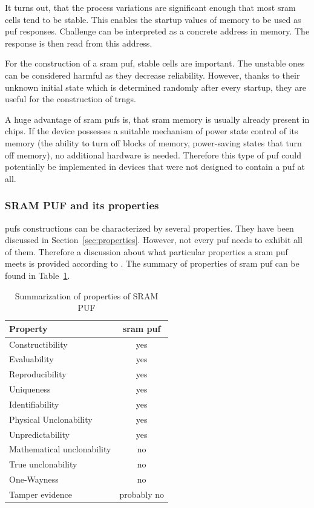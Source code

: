 It turns out, that the process variations are significant enough that most \gls{sram} cells tend to be stable. This enables the startup values of memory to be used as \gls{puf} responses. Challenge can be interpreted as a concrete address in memory. The response is then read from this address.\cite{Maes2013}

For the construction of a \gls{sram} \gls{puf}, stable cells are important. The unstable ones can be considered harmful as they decrease reliability. However, thanks to their unknown initial state which is determined randomly after every startup, they are useful for the construction of \glspl{trng}.\cite{Holcomb2009}

A huge advantage of \gls{sram} \glspl{puf} is, that \gls{sram} memory is usually already present in chips. If the device possesses a suitable mechanism of power state control of its memory (the ability to turn off blocks of memory, power-saving states that turn off memory), no additional hardware is needed. Therefore this type of \gls{puf} could potentially be implemented in devices that were not designed to contain a \gls{puf} at all.

\subsubsection*{SRAM PUF and its properties}\label{sec:srampuf_properties}

\glspl{puf} constructions can be characterized by several properties. They have been discussed in Section~\ref{sec:properties}. However, not every \gls{puf} needs to exhibit all of them. Therefore a discussion about what particular properties a \gls{sram} \gls{puf} meets is provided according to \cite{Maes2013}. The summary of properties of \gls{sram} \gls{puf} can be found in Table~\ref{table:sram_puf_properties}.

\begin{table}[h!]
\centering
\begin{tabular}{l c} 
    \textbf{Property} & \textbf{\gls{sram} \gls{puf}} \\
     \hline
    Constructibility & yes\\ 
    Evaluability & yes\\
    Reproducibility & yes\\
    Uniqueness & yes\\
    Identifiability & yes\\ 
    Physical Unclonability & yes\\
    Unpredictability & yes\\
    Mathematical unclonability & no\\
    True unclonability & no\\
    One-Wayness & no\\
    Tamper evidence & probably no\\
     \hline
    \end{tabular}
    \captionsetup{justification=centering,margin=0.5cm}
    \caption{Summarization of properties of SRAM PUF}
    \label{table:sram_puf_properties}
\end{table}


